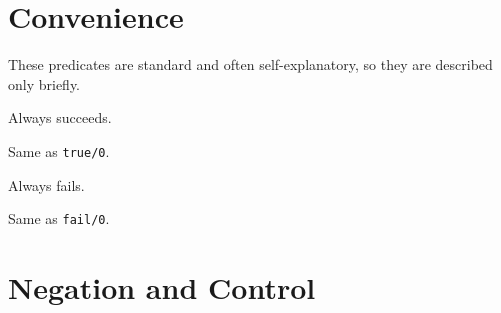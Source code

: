 \section{Convenience} \label{Convenience}
These predicates are standard and often self-explanatory, so they are 
described only briefly.
\begin{description}

    Always succeeds.

    Same as {\tt true/0}.

    Always fails.

    Same as {\tt fail/0}.

\end{description}

\section{Negation and Control}\label{sec:control}

